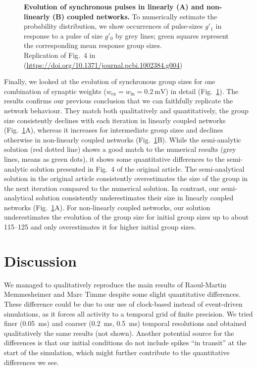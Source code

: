 \documentclass[10pt,a4paper,onecolumn]{article}
\begin{document}
\begin{figure}
\begin{subfigure}[t]{0.5\textwidth}
\end{subfigure}
\caption{\label{fig:markov}
\textbf{Evolution of synchronous pulses in linearly (A) and non-linearly (B) coupled networks.} To numerically estimate the probability distribution, we show occurrences of pulse-sizes $g'_1$ in response to a pulse of size $g'_0$ by grey lines; green squares represent the corresponding mean response group sizes.\\
Replication of Fig.~4 in \cite{Memmesheimer2012} (\url{https://doi.org/10.1371/journal.pcbi.1002384.g004})}
\end{figure}

Finally, we looked at the evolution of synchronous group sizes for one combination of synaptic weights ($w_\text{ex}=w_\text{in}=\SI{0.2}{\milli\volt}$) in detail (Fig.~\ref{fig:markov}). The results confirms our previous conclusion that we can faithfully replicate the network behaviour. They match both qualitatively and quantitatively, the group size consistently declines with each iteration in linearly coupled networks (Fig.~\ref{fig:markov}A), whereas it increases for intermediate group sizes and declines otherwise in non-linearly coupled networks (Fig.~\ref{fig:markov}B). While the semi-analytic solution (red dotted line) shows a good match to the numerical results (grey lines, means as green dots), it shows some quantitative differences to the semi-analytic solution presented in Fig.~4 of the original article. The semi-analytical solution in the original article consistently overestimates the size of the group in the next iteration compared to the numerical solution. In contrast, our semi-analytical solution consistently underestimates their size in linearly coupled networks (Fig.~\ref{fig:markov}A). For non-linearly coupled networks, our solution underestimates the evolution of the group size for initial group sizes up to about 115--125 and only overestimates it for higher initial group sizes.

\section*{Discussion}

We managed to qualitatively reproduce the main results of Raoul-Martin Memmes\-heimer and Marc Timme \cite{Memmesheimer2012} despite some slight quantitative differences. These difference could be due to our use of clock-based instead of event-driven simulations, as it forces all activity to a temporal grid of finite precision. We tried finer (\SI{0.05}{\milli\second}) and coarser (\SI{0.2}{\milli\second}, \SI{0.5}{\milli\second}) temporal resolutions and obtained qualitatively the same results (not shown). Another potential source for the differences is that our initial conditions do not include spikes ``in transit'' at the start of the simulation, which might further contribute to the quantitative differences we see.
\end{document}
